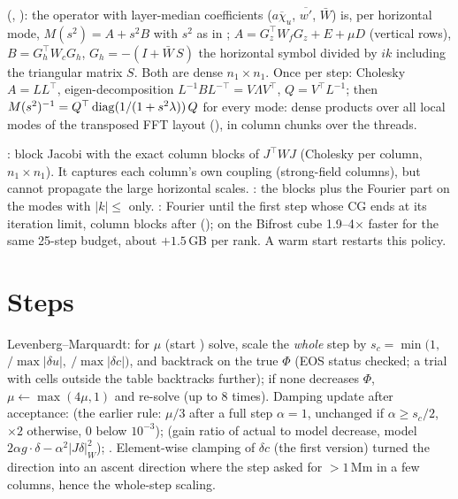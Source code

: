 \textbf{} (, ): the operator with layer-median coefficients
($\overline{a\chi_u}$, $\overline{w'}$, $\bar W$) is, per horizontal mode, $M(s^2)=A+s^2B$ with $s^2$ as in
; $A=G_z^\top W_fG_z+E+\mu D$ (vertical rows), $B=G_h^\top W_cG_h$, $G_h=-(I+\bar W\,S)$ the
horizontal symbol divided by $ik$ including the triangular matrix $S$. Both are dense $n_1\times n_1$. Once per
step: Cholesky $A=LL^\top$, eigen-decomposition $L^{-1}BL^{-\top}=V\Lambda V^\top$, $Q=V^\top L^{-1}$; then
$M(s^2)^{-1}=Q^\top\,{\rm diag}(1/(1+s^2\lambda))\,Q$ for every mode: dense products over all local modes of the transposed FFT
layout (), in column chunks over the threads.

\textbf{}: block Jacobi with the exact column blocks of $J^\top WJ$ (Cholesky per column, $n_1\times n_1$). It
captures each column's own coupling (strong-field columns), but cannot propagate the large horizontal scales.
\textbf{}: the blocks plus the Fourier part on the modes with $|k|\le$  only. \textbf{}:
Fourier until the first step whose CG ends at its iteration limit, column blocks after (); on
the Bifrost cube 1.9--4$\times$ faster for the same 25-step budget, about $+1.5$\,GB per rank. A warm start restarts this policy.

\section{Steps}
Levenberg--Marquardt: for $\mu$ (start ) solve, scale the \emph{whole} step by
$s_c=\min(1,\ $$/\max|\delta u|,\ $$/\max|\delta c|)$, and backtrack on the true $\Phi$ (EOS
status checked; a trial with cells outside the table backtracks further); if none decreases $\Phi$, $\mu\leftarrow\max(4\mu,1)$
and re-solve (up to 8 times). Damping update after acceptance:  (the earlier rule: $\mu/3$ after a full step
$\alpha=1$, unchanged if $\alpha\ge s_c/2$, $\times2$ otherwise, 0 below $10^{-3}$);  (gain ratio of actual to model
decrease, model $2\alpha g\cdot\delta-\alpha^2|J\delta|_W^2$); . Element-wise clamping of $\delta c$ (the first
version) turned the direction into an ascent direction where the step asked for $>1$\,Mm in a few columns, hence the whole-step
scaling.


